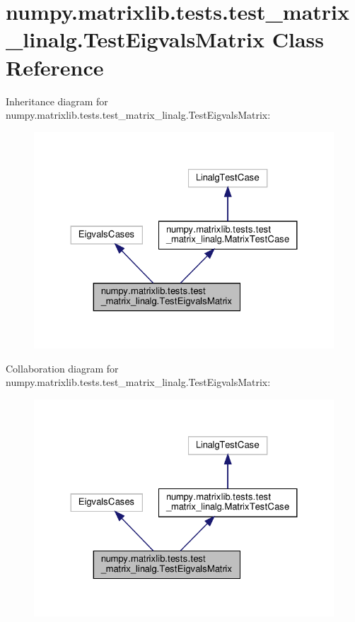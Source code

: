 \hypertarget{classnumpy_1_1matrixlib_1_1tests_1_1test__matrix__linalg_1_1TestEigvalsMatrix}{}\section{numpy.\+matrixlib.\+tests.\+test\+\_\+matrix\+\_\+linalg.\+Test\+Eigvals\+Matrix Class Reference}
\label{classnumpy_1_1matrixlib_1_1tests_1_1test__matrix__linalg_1_1TestEigvalsMatrix}


Inheritance diagram for numpy.\+matrixlib.\+tests.\+test\+\_\+matrix\+\_\+linalg.\+Test\+Eigvals\+Matrix\+:
\nopagebreak
\begin{figure}[H]
\begin{center}
\leavevmode
\includegraphics[width=324pt]{classnumpy_1_1matrixlib_1_1tests_1_1test__matrix__linalg_1_1TestEigvalsMatrix__inherit__graph}
\end{center}
\end{figure}


Collaboration diagram for numpy.\+matrixlib.\+tests.\+test\+\_\+matrix\+\_\+linalg.\+Test\+Eigvals\+Matrix\+:
\nopagebreak
\begin{figure}[H]
\begin{center}
\leavevmode
\includegraphics[width=324pt]{classnumpy_1_1matrixlib_1_1tests_1_1test__matrix__linalg_1_1TestEigvalsMatrix__coll__graph}
\end{center}
\end{figure}
